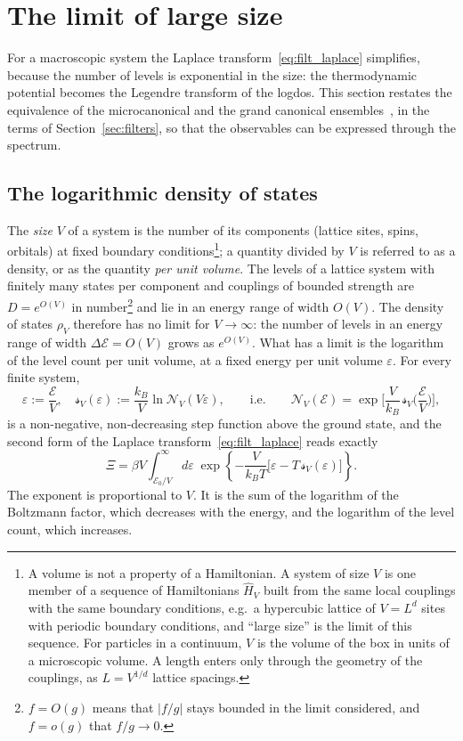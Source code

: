 \documentclass[10pt,a4paper]{article}
\theoremstyle{plain}
\newcommand{\cN}{\mathcal{N}}   %
\newcommand{\lndos}{{logdos}}  %
\newcommand{\enrg}{\mathcal{E}}  %
\newcommand{\lds}{\mathscr{s}}  %
\begin{document}
\section{The limit of large size}
\label{sec:large}

For a macroscopic system the Laplace transform~\eqref{eq:filt_laplace}
simplifies, because the number of levels is exponential in the size: the
thermodynamic potential becomes the Legendre transform of the \lndos. This
section restates the equivalence of the microcanonical and the grand
canonical ensembles~\cite[Ch.~2]{Schwabl}, \cite{Ruelle} in the terms of
Section~\ref{sec:filters}, so that the observables can be expressed through
the spectrum.

\subsection{The logarithmic density of states}
\label{sec:large_ext}

The \emph{size} $V$ of a system is the number of its components (lattice
sites, spins, orbitals) at fixed boundary conditions\footnote{A volume is
not a property of a Hamiltonian. A system of size $V$ is one member of a
sequence of Hamiltonians $\hat H_V$ built from the same local couplings with
the same boundary conditions, e.g.\ a hypercubic lattice of $V=L^{d}$ sites
with periodic boundary conditions, and ``large size'' is the limit of this
sequence. For particles in a continuum, $V$ is the volume of the box in
units of a microscopic volume. A length enters only through the geometry of
the couplings, as $L=V^{1/d}$ lattice spacings.}; a quantity divided by $V$
is referred to as a density, or as the quantity \emph{per unit volume}. The
levels of a lattice
system with finitely many states per component and couplings of bounded
strength are $D=e^{O(V)}$ in number\footnote{$f=O(g)$ means that $|f/g|$
stays bounded in the limit considered, and $f=o(g)$ that $f/g\to0$.} and lie
in an energy range of width $O(V)$. The density of states $\rho_V$ therefore
has no limit for $V\to\infty$: the number of levels in an energy range of
width $\Delta\enrg=O(V)$ grows as $e^{O(V)}$. What has a limit is the
logarithm of the level count per unit volume, at a fixed energy per unit
volume $\varepsilon$. For every finite system,
\begin{equation}\label{eq:filt_sV}
  \varepsilon := \frac{\enrg}{V}, \quad
  \lds_V(\varepsilon):=\frac{k_B}{V}\ln\cN_V(V\varepsilon) ,
  \qquad\text{i.e.}\qquad
  \cN_V(\enrg)=\exp\Big[\frac{V}{k_B}\,\lds_V\Big(\frac{\enrg}{V}\Big)\Big] ,
\end{equation}
is a non-negative, non-decreasing step function above the ground state, and
the second form of the Laplace transform~\eqref{eq:filt_laplace} reads
exactly
\begin{equation}\label{eq:filt_laplace_V}
  \Xi=\beta V\int_{\enrg_0/V}^{\infty}d\varepsilon\;
  \exp\left\{-\frac{V}{k_BT}\big[\varepsilon-T\,\lds_V(\varepsilon)\big]\right\} .
\end{equation}
The exponent is proportional to $V$. It is the sum of the logarithm of the
Boltzmann factor, which decreases with the energy, and the logarithm of the
level count, which increases.
\end{document}
